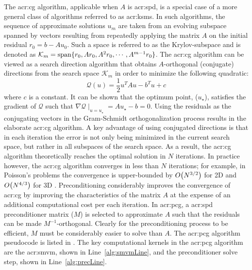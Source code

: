 The \gls{acr:cg} algorithm, applicable when $A$ is \gls{acr:spd}, is a special case of a more general class of algorithms referred to as \glspl{acr:ksm}.
In such algorithms, the sequence of approximate solutions $u_m$ are taken from an evolving subspace spanned by vectors resulting from repeatedly applying the matrix $A$ on the initial residual $r_0 = b-Au_0$.
Such a space is referred to as the Krylov-subspace and is denoted as $\mathcal{K}_m =  \operatorname{span} \{r_0,Ar_0,A^2r_0,\cdots,A^{m-1}r_0\}$.
The \gls{acr:cg} algorithm can be viewed as a search direction algorithm that obtains $A$-orthogonal (conjugate) directions from the search space $\mathcal{K}_m$ in order to minimize the following quadratic:
\begin{equation}
	\mathcal{Q}(u) = \frac{1}{2}u^TAu-b^Tu + c \label{eqn:quad}
\end{equation}
where $c$ is a constant.
It can be shown that the optimum point, ($u_\star$), satisfies the gradient of $\mathcal{Q}$ such that $\nabla\mathcal{Q}\mid_{u=u_\star} = Au_\star - b = 0$.
Using the residuals as the conjugating vectors in the Gram-Schmidt orthogonalization process results in the elaborate \gls{acr:cg} algorithm.
A key advantage of using conjugated directions is that in each iteration the error is not only being minimized in the current search space, but rather in all subspaces of the search space.
As a result, the \gls{acr:cg} algorithm theoretically reaches the optimal solution in $N$ iterations.
In practice however, the \gls{acr:cg} algorithm converges in less than $N$ iterations; for example, in Poisson's problems the convergence is upper-bounded by $ O\bigl(N^{3/2}\bigr)$ for 2D and $ O\bigl(N^{4/3}\bigr)$ for 3D \cite{bib:Shewchuk1994ICG}.
Preconditioning considerably improves the convergence of \gls{acr:cg} by improving the characteristics of the matrix $A$ at the expense of an additional computational cost per each iteration.
In \gls{acr:pcg}, a \gls{acr:spd} preconditioner matrix ($M$) is selected to approximate $A$ such that the residuals can be made $M^{-1}$-orthogonal.
Clearly for the preconditioning process to be efficient, $M$ must be considerably easier to solve than $A$.
The \gls{acr:pcg} algorithm pseudocode is listed in .  
The key computational kernels in the \gls{acr:pcg} algorithm are the \gls{acr:smvm}, shown in Line~\ref{alg:smvmLine}, and the preconditioner solve step, shown in Line~\ref{alg:precLine}.

